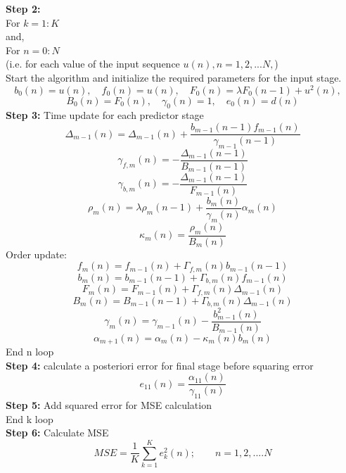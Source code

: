 \documentclass[journal]{IEEEtran}
\begin{document}
\textbf{Step 2:}\\
For $k = 1:K$\\
and,\\
For $n = 0:N$\\
(i.e. for each value of the input sequence $u(n), n = 1,2,...N,$)
\\ \indent Start the algorithm and initialize the required parameters for the input stage.
$$b_0(n) = u(n), \quad f_0(n) = u(n), \quad F_0(n) = \lambda F_0(n-1) + u^2(n), \quad$$
$$B_0(n) = F_0(n), \quad \gamma_0(n) = 1,\quad e_0(n) = d(n)$$
\indent \textbf{Step 3:} Time update for each predictor stage
\begin{equation}
  \Delta_{m-1}(n) = \Delta_{m-1}(n) + \dfrac{b_{m-1}(n-1)f_{m-1}(n)}{\gamma_{m-1}(n-1)}
\end{equation}
\begin{equation}
  \gamma_{f,m}(n)= -\dfrac{\Delta_{m-1}(n-1)}{B_{m-1}(n-1)}
\end{equation}
\begin{equation}
  \gamma_{b,m}(n)= -\dfrac{\Delta_{m-1}(n-1)}{F_{m-1}(n)}
\end{equation}
\begin{equation}
  \rho_m(n) = \lambda\rho_m(n-1)+\dfrac{b_{m}(n)}{\gamma_{m}(n)}\alpha_m(n)
\end{equation}
\begin{equation}
  \kappa_m(n) = \dfrac{\rho_{m}(n)}{B_{m}(n)}
\end{equation}
\indent Order update:
\begin{equation}
  f_m(n) = f_{m-1}(n) + \Gamma_{f,m}(n)b_{m-1}(n-1)
\end{equation}
\begin{equation}
  b_m(n) = b_{m-1}(n-1) + \Gamma_{b,m}(n)f_{m-1}(n)
\end{equation}
\begin{equation}
  F_m(n) = F_{m-1}(n) + \Gamma_{f,m}(n)\Delta_{m-1}(n)
\end{equation}
\begin{equation}
  B_m(n) = B_{m-1}(n-1) + \Gamma_{b,m}(n)\Delta_{m-1}(n)
\end{equation}
\begin{equation}
  \gamma_m(n) = \gamma_{m-1}(n) - \dfrac{b^2_{m-1}(n)}{B_{m-1}(n)}
\end{equation}
\begin{equation}
  \alpha_{m+1}(n) = \alpha_{m}(n) - \kappa_m(n)b_m(n)
\end{equation}
End n loop\\
\indent \textbf{Step 4:} calculate a posteriori error for final stage before squaring error
\begin{equation}
  e_{11}(n) = \dfrac{\alpha_{11}(n)}{\gamma_{11}(n)}
\end{equation}
\textbf{Step 5:} Add squared error for MSE calculation\\
End k loop\\
\textbf{Step 6:} Calculate MSE
\begin{equation}
  \label{eq:MSE}
  MSE=\dfrac{1}{K}\sum_{k=1}^{K}e_k^2(n); \qquad n = 1,2,....N
\end{equation}
\end{document}
